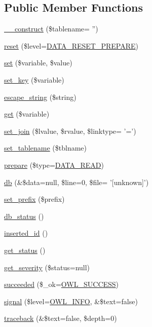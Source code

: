 \subsection*{Public Member Functions}
\begin{DoxyCompactItemize}
\item 
\hyperlink{classDataHandler_a4fd274c45bf06283b05e757b7c081439}{\_\-\_\-construct} (\$tablename= '')
\item 
\hyperlink{classDataHandler_ab89e1aaad9cd0a37f1c7f13c1d9c0d57}{reset} (\$level=\hyperlink{class_8datahandler_8php_a19a99423705b41e563424ae76d7fe184}{DATA\_\-RESET\_\-PREPARE})
\item 
\hyperlink{classDataHandler_a296f26f5af1e46a49ae44110848fa031}{set} (\$variable, \$value)
\item 
\hyperlink{classDataHandler_a32ce223478b78a4ea9838a3c6ac7440c}{set\_\-key} (\$variable)
\item 
\hyperlink{classDataHandler_a435338a167a44a041af2895859abb0c9}{escape\_\-string} (\$string)
\item 
\hyperlink{classDataHandler_a7dcf85dac419f51ad4daa166c928a399}{get} (\$variable)
\item 
\hyperlink{classDataHandler_a9b77733f02e9d6281fc40df110c0ba70}{set\_\-join} (\$lvalue, \$rvalue, \$linktype= '=')
\item 
\hyperlink{classDataHandler_abcb68472abd7da8ee6296421f0a7f2e9}{set\_\-tablename} (\$tblname)
\item 
\hyperlink{classDataHandler_af3e7a17194e97300d499e9178f4913cb}{prepare} (\$type=\hyperlink{class_8datahandler_8php_ac28f74b49007773d24ca2207baac6d32}{DATA\_\-READ})
\item 
\hyperlink{classDataHandler_ad0d98add797178eb7192333dcc2bab4c}{db} (\&\$data=null, \$line=0, \$file= '\mbox{[}unknown\mbox{]}')
\item 
\hyperlink{classDataHandler_a27db6fb8365b7def4db7bd72984a0089}{set\_\-prefix} (\$prefix)
\item 
\hyperlink{classDataHandler_a3c82ec0a40dabcc55dc203c96abf02d2}{db\_\-status} ()
\item 
\hyperlink{classDataHandler_ae025dc51e854e8d5d534c5e26c617470}{inserted\_\-id} ()
\item 
\hyperlink{class__OWL_a99ec771fa2c5c279f80152cc09e489a8}{get\_\-status} ()
\item 
\hyperlink{class__OWL_adf9509ef96858be7bdd9414c5ef129aa}{get\_\-severity} (\$status=null)
\item 
\hyperlink{class__OWL_ae76c46aff1ad253106332670fc59c777}{succeeded} (\$\_\-ok=\hyperlink{owl_8severitycodes_8php_a96223f06ba27bf5cbefa6e9d702897c2}{OWL\_\-SUCCESS})
\item 
\hyperlink{class__OWL_a51ba4a16409acf2a2f61f286939091a5}{signal} (\$level=\hyperlink{owl_8severitycodes_8php_a139328861128689f2f4def6a399d9057}{OWL\_\-INFO}, \&\$text=false)
\item 
\hyperlink{class__OWL_aa29547995d6741b7d2b90c1d4ea99a13}{traceback} (\&\$text=false, \$depth=0)
\end{DoxyCompactItemize}
